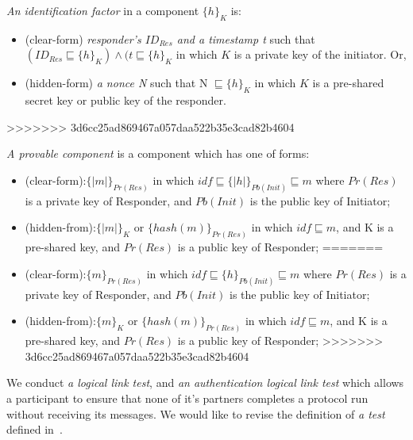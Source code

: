 \begin{flushleft}
\begin{flushleft}
\begin{Definition}
\begin{itemize}
\begin{Definition}
\begin{Definition} \emph{An identification factor} in a component $\{h\}_K$ is:
\begin{itemize}
	\item(clear-form) \emph{responder's $ID_{Res}$ and a timestamp t} such that $(ID_{Res} \sqsubseteq \{h\}_K ) \wedge (t \sqsubseteq \{h\}_K$ in which $K$ is a private key of the initiator. Or, 
	\item(hidden-form) \emph{a nonce N} such that N $\sqsubseteq \{h\}_K$ in which $K$ is a pre-shared secret key or public key of the responder.\end{itemize}
>>>>>>> 3d6cc25ad869467a057daa522b35e3cad82b4604
\end{Definition}

\begin{Definition}\emph{A provable component} is a component which has one of forms:
\begin{itemize}
<<<<<<< HEAD
	\item (clear-form):$\{|m|\}_{Pr(Res)}$ in which $idf \sqsubseteq \{|h|\}_{Pb(Init)} \sqsubseteq m$ where $Pr(Res)$ is a private key of Responder, and $Pb(Init)$ is the public key of Initiator;  
	\item (hidden-from):$\{|m|\}_K$ or $\{hash(m)\}_{Pr(Res)}$ in which $idf \sqsubseteq m$, and K is a pre-shared key, and $Pr(Res)$ is a public key of Responder;
=======
	\item (clear-form):$\{m\}_{Pr(Res)}$ in which $idf \sqsubseteq \{h\}_{Pb(Init)} \sqsubseteq m$ where $Pr(Res)$ is a private key of Responder, and $Pb(Init)$ is the public key of Initiator;  
	\item (hidden-from):$\{m\}_K$ or $\{hash(m)\}_{Pr(Res)}$ in which $idf \sqsubseteq m$, and K is a pre-shared key, and $Pr(Res)$ is a public key of Responder;
>>>>>>> 3d6cc25ad869467a057daa522b35e3cad82b4604
\end{itemize}
\end{Definition}

We conduct \emph{a logical link test}, and \emph{an authentication logical link test} which allows a participant to ensure that none of it's partners completes a protocol run without receiving its messages. We would like to revise the definition of \emph{a test} defined in~\cite{authenticationtests}. 


\end{Definition}
\end{itemize}
\end{Definition}
\end{flushleft}
\end{flushleft}
